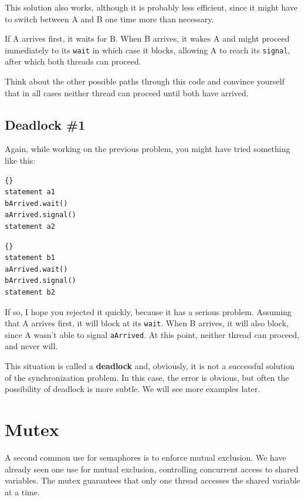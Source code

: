 \documentclass{book}
\begin{document}
This solution also works, although it is probably less
efficient, since it might have to switch between A and B
one time more than necessary.

If A arrives first, it waits for B.  When B arrives, it wakes
A and might proceed immediately to its {\tt wait} in which
case it blocks, allowing A to reach its {\tt signal}, after
which both threads can proceed.

Think about the other possible paths through this code and
convince yourself that in all cases neither thread can
proceed until both have arrived.

\subsection {Deadlock \#1}

Again, while working on the previous problem, you might have
tried something like this:

\noindent\begin{minipage}[t]{0.4\textwidth}
    \begin{lstlisting}[title={Thread A}]{}
statement a1
bArrived.wait()
aArrived.signal()
statement a2
\end{lstlisting}
\end{minipage}
\hfill
\noindent\begin{minipage}[t]{0.4\textwidth}
    \begin{lstlisting}[title={Thread B}]{}
statement b1
aArrived.wait()
bArrived.signal()
statement b2
\end{lstlisting}
\end{minipage}

If so, I hope you rejected it quickly, because it has a serious
problem.  Assuming that A arrives first, it will block at its
    {\tt wait}.  When B arrives, it will also block, since A wasn't
able to signal {\tt aArrived}.  At this point, neither thread
can proceed, and never will.

This situation is called a {\bf deadlock} and, obviously, it is
not a successful solution of the synchronization problem.  In
this case, the error is obvious, but often the possibility of
deadlock is more subtle.  We will see more examples later.


\section{Mutex}

A second common use for semaphores is to enforce mutual exclusion.
We have already seen one use for mutual exclusion, controlling
concurrent access to shared variables.  The mutex guarantees
that only one thread accesses the shared variable at a time.
\end{document}
